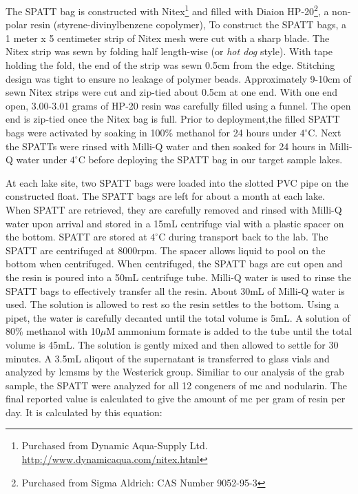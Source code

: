 The SPATT bag is constructed with Nitex\footnote{Purchased from Dynamic Aqua-Supply Ltd.  \url{http://www.dynamicaqua.com/nitex.html}} and filled with Diaion\texttrademark \: HP-20\footnote{Purchased from Sigma Aldrich: CAS Number 9052-95-3}, a non-polar resin (styrene-divinylbenzene copolymer),
To construct the SPATT bags, a 1 meter x 5 centimeter strip of Nitex mesh were cut with a sharp blade. The Nitex strip was sewn by folding half length-wise (or \emph{hot dog} style). With tape holding the fold, the end of the strip was sewn 0.5cm from the edge. Stitching design was tight to ensure no leakage of polymer beads. Approximately 9-10cm of sewn Nitex strips were cut and zip-tied about 0.5cm at one end. With one end open, 3.00-3.01 grams of HP-20 resin was carefully filled using a funnel. The open end is zip-tied once the Nitex bag is full. Prior to deployment,the filled SPATT bags were activated by soaking in 100\% methanol for 24 hours under $4^\circ$C. Next the SPATTs were rinsed with Milli-Q water and then soaked for 24 hours in Milli-Q water under $4^\circ$C before deploying the SPATT bag in our target sample lakes.

At each lake site, two SPATT bags were loaded into the slotted PVC pipe on the constructed float. The SPATT bags are left for about a month at each lake. When SPATT are retrieved, they are carefully removed and rinsed with Milli-Q water upon arrival and stored in a 15mL centrifuge vial with a plastic spacer on the bottom. SPATT are stored at $4^\circ$C during transport back to the lab. The SPATT are centrifuged at 8000rpm. The spacer allows liquid to pool on the bottom when centrifuged. When centrifuged, the SPATT bags are cut open and the resin is poured into a 50mL centrifuge tube. Milli-Q water is used to rinse the SPATT bags to effectively transfer all the resin. About 30mL of Milli-Q water is used. The solution is allowed to rest so the resin settles to the bottom. Using a pipet, the water is carefully decanted until the total volume is 5mL.  A solution of 80\% methanol with 10$\mu$M ammonium formate is added to the tube until the total volume is 45mL. The solution is gently mixed and then allowed to settle for 30 minutes. A 3.5mL aliqout of the supernatant is transferred to glass vials and analyzed by \gls{lcmsms} by the Westerick group. Similiar to our analysis of the grab sample, the SPATT were analyzed for all 12 congeners of \gls{mc} and nodularin. The final reported value is calculated to give the amount of \gls{mc} per gram of resin per day. It is calculated by this equation:

